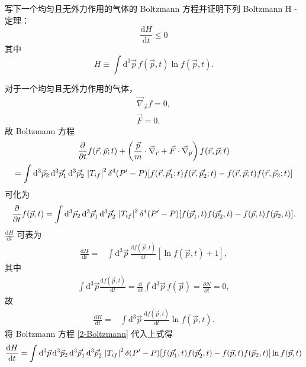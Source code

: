 \documentclass{assignment}
\begin{document}
\begin{prob}
    写下一个均匀且无外力作用的气体的 Boltzmann 方程并证明下列 Boltzmann H - 定理：
    \[
        \frac{\mathrm{d}H}{\mathrm{d}t}\leq 0
    \]
    其中
    \[
        H\equiv\int\mathrm{d}^3\vec{p}\,f(\vec{p},t)\ln f(\vec{p},t).
    \]
\end{prob}
\begin{pf}
    对于一个均匀且无外力作用的气体，
    \begin{gather}
        \vec{\nabla}_{\vec{r}}f=0,\\
        \vec{F}=0.
    \end{gather}
    故 Boltzmann 方程
    \begin{gather}
        \notag\frac{\partial}{\partial t}f(\vec{r},\vec{p};t)+\left(\frac{\vec{p}}{m}\cdot\vec{\nabla}_{\vec{r}}+\vec{F}\cdot\vec{\nabla}_{\vec{p}}\right)f(\vec{r},\vec{p};t)\\
        =\int\mathrm{d}^3\vec{p}_2\,\mathrm{d}^3\vec{p}_1'\,\mathrm{d}^3\vec{p}_2'\,\left\lvert T_{if}\right\rvert^2\delta^4(P'-P)[f(\vec{r},\vec{p}_1';t)f(\vec{r},\vec{p}_2';t)-f(\vec{r},\vec{p};t)f(\vec{r},\vec{p}_2;t)]
    \end{gather}
    可化为
    \begin{align}
        \label{2-Boltzmann}
        \frac{\partial}{\partial t}f(\vec{p},t)=\int\mathrm{d}^3\vec{p}_2\,\mathrm{d}^3\vec{p}_1'\,\mathrm{d}^3\vec{p}_2'\,\left\lvert T_{if}\right\rvert^2\delta^4(P'-P)[f(\vec{p}_1',t)f(\vec{p}_2',t)-f(\vec{p},t)f(\vec{p}_2,t)].
    \end{align}
    $\frac{\mathrm{d}H}{\mathrm{d}t}$ 可表为
    \begin{align}
        \frac{\mathrm{d}H}{\mathrm{d}t}=&\int\mathrm{d}^3\vec{p}\,\frac{\mathrm{d}f(\vec{p},t)}{\mathrm{d}t}[\ln f(\vec{p},t)+1],
    \end{align}
    其中
    \begin{align}
        \int\mathrm{d}^3\vec{p}\frac{\mathrm{d}f(\vec{p},t)}{\mathrm{d}t}=\frac{\mathrm{d}}{\mathrm{d}t}\int\mathrm{d}^3\vec{p}\,f(\vec{p})=\frac{\partial N}{\partial t}=0,
    \end{align}
    故
    \begin{align}
        \frac{\mathrm{d}H}{\mathrm{d}t}=&\int\mathrm{d}^3\vec{p}\,\frac{\mathrm{d}f(\vec{p},t)}{\mathrm{d}t}\ln f(\vec{p},t).
    \end{align}
    将 Boltzmann 方程 \eqref{2-Boltzmann} 代入上式得
    \begin{align}
        \label{2-dH/dt-1}
        \frac{\mathrm{d}H}{\mathrm{d}t}=\int\mathrm{d}^3\vec{p}\,\mathrm{d}^3\vec{p}_2\,\mathrm{d}^3\vec{p}_1'\,\mathrm{d}^3\vec{p}_2'\,\abs{T_{if}}^2\delta(P'-P)[f(\vec{p}_1',t)f(\vec{p}_2',t)-f(\vec{p},t)f(\vec{p}_2,t)]\ln f(\vec{p},t)

\end{align}
\end{pf}
\end{document}

